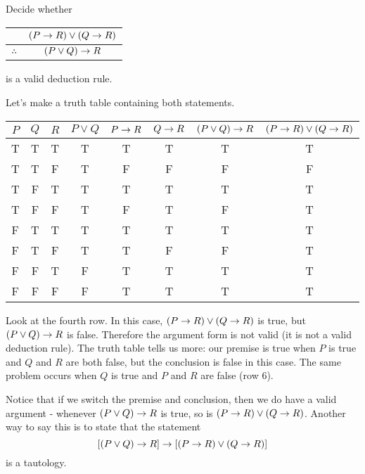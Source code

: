 \documentclass[12pt]{article}
\begin{document}
\begin{example}
 Decide whether
 \begin{center}
  \begin{tabular}{rc}
   &  $(P \rightarrow R) \vee (Q \rightarrow R)$ \\ \hline
 $\therefore$  & $(P \vee Q) \rightarrow R$
  \end{tabular}
  \end{center}
is a valid deduction rule.
\begin{solution}
 Let's make a truth table containing both statements. 
 
 \begin{center}
 \begin{tabular}{c|c|c||c|c|c|c|c}
  $P$ & $Q$ & $R$ & $P\vee Q$ & $P \rightarrow R$ & $Q \rightarrow R$ & $(P\vee Q) \rightarrow R$ 	& $(P\rightarrow R) \vee (Q \rightarrow R)$ \\ \hline
  T   & T   & T   & T         & T          & T  	 & T 			& T \\
  T   & T   & F   & T         & F          & F 	 & F			& F \\
  T   & F   & T   & T         & T 	    & T 	 & T			& T \\
  T   & F   & F   & T		& F 	    & T 	 & F			& T \\
  F   & T   & T   & T 		& T 	    & T          & T			& T \\  
  F   & T   & F   & T 		& T 	    & F          & F			& T \\  
  F   & F   & T   & F 		& T 	    & T          & T			& T \\  
  F   & F   & F   & F 		& T 	    & T          & T			& T \\  
  
 \end{tabular}
  \end{center}
  
  Look at the fourth row.  In this case, $(P \rightarrow R) \vee (Q \rightarrow R)$ is true, but $(P \vee Q) \rightarrow R$ is false.  Therefore the argument form is not valid (it is not a valid deduction rule).  The truth table tells us more: our premise is true when $P$ is true and $Q$ and $R$ are both false, but the conclusion is false in this case.  The same problem occurs when $Q$ is true and $P$ and $R$ are false (row 6).  
  
  Notice that if we switch the premise and conclusion, then we do have a valid argument - whenever $(P\vee Q) \rightarrow R$ is true, so is $(P \rightarrow R) \vee (Q \rightarrow R)$.  Another way to say this is to state that the statement
  \[[(P \vee Q) \rightarrow R] \rightarrow [(P \rightarrow R) \vee (Q \rightarrow R)]\]
  is a tautology.
\end{solution}
\end{example}
\end{document}
